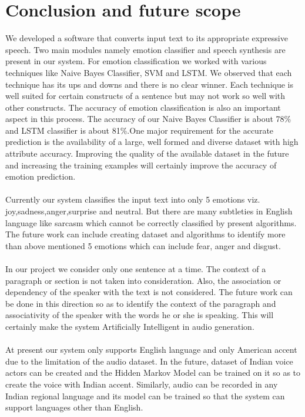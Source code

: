 \documentclass[oneside,a4paper,12pt]{book}
\begin{document}
 \chapter{Conclusion and future scope}
We developed a software that converts input text to its appropriate expressive speech.
Two main modules namely emotion classifier and speech synthesis are present in our system.
For emotion classification we worked with various techniques like Naive Bayes Classifier,
SVM and LSTM. We observed that each technique has its ups and downs and there is no clear
winner. Each technique is well suited for certain constructs of a sentence but may not work
so well with other constructs. The accuracy of emotion classification is also an important aspect
in this process. The accuracy of our Naive Bayes Classifier is about 78\% and LSTM classifier is
about 81\%.One major requirement for the accurate prediction is the availability of a large, well formed
and diverse dataset with high attribute accuracy. Improving the quality of the available dataset in the future
and increasing the training examples will certainly improve the accuracy of emotion prediction.\\\\
Currently our system classifies the input text into only 5 emotions viz. joy,sadness,anger,surprise
and neutral. But there are many subtleties in English language like sarcasm which cannot be correctly
classified by present algorithms. The future work can include creating dataset and algorithms to identify more than above mentioned 5 emotions which can include fear, anger and disgust.\\\\
In our project we consider only one sentence at a time. The
context of a paragraph or section is not taken into consideration. Also, the association or dependency of the speaker with the text is not considered. The future work can be done in this direction so as to identify the context of the paragraph and associativity of the speaker with the words he or she is speaking. This will certainly make the system Artificially Intelligent in audio generation.\\\\
At present our system only supports
English language and only American accent due to the limitation of the audio dataset. In the future, dataset of Indian voice actors can be created and the Hidden Markov Model can be trained on it so as to create the voice with Indian accent. Similarly, audio can be recorded in any Indian regional language and its model can be trained so that the system can support languages other than English.\\\\
\end{document}
